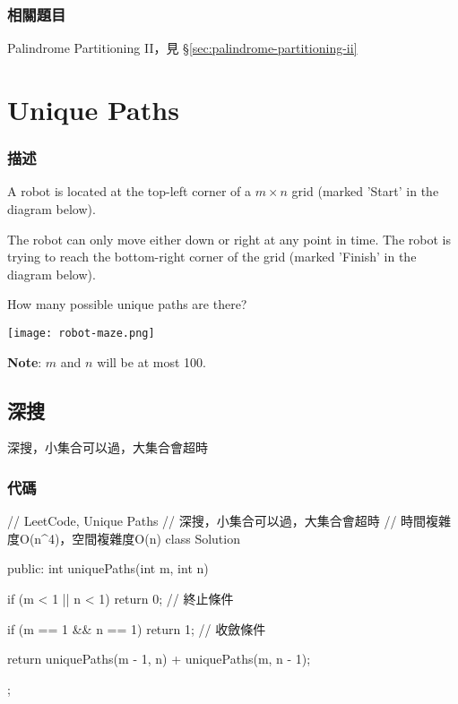 \subsubsection{相關題目}

\begindot
\item Palindrome Partitioning II，見 \S \ref{sec:palindrome-partitioning-ii}
\myenddot


\section{Unique Paths} %
\label{sec:unique-paths}


\subsubsection{描述}
A robot is located at the top-left corner of a $m \times n$ grid (marked 'Start' in the diagram below).

The robot can only move either down or right at any point in time. The robot is trying to reach the bottom-right corner of the grid (marked 'Finish' in the diagram below).

How many possible unique paths are there?

\begin{center}
\texttt{[image: robot-maze.png]}\\
\label{fig:unique-paths}
\end{center}

\textbf{Note}: $m$ and $n$ will be at most 100.


\subsection{深搜}
深搜，小集合可以過，大集合會超時

\subsubsection{代碼}
\begin{Code}
// LeetCode, Unique Paths
// 深搜，小集合可以過，大集合會超時
// 時間複雜度O(n^4)，空間複雜度O(n)
class Solution {
public:
    int uniquePaths(int m, int n) {
        if (m < 1 || n < 1) return 0; // 終止條件

        if (m == 1 && n == 1) return 1; // 收斂條件

        return uniquePaths(m - 1, n) + uniquePaths(m, n - 1);
    }
};
\end{Code}


